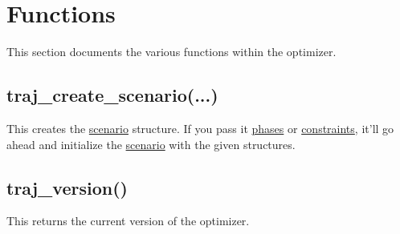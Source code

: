 \documentclass{article}
\begin{document}
	\section{Functions}
		This section documents the various functions within the optimizer.

		\subsection{traj\_create\_scenario(...)}
			This creates the \hyperref[sec:scenario]{scenario} structure. If you pass it \hyperref[sec:phase]{phases} or
			\hyperref[sec:constraint]{constraints}, it'll go ahead and initialize the \hyperref[sec:scenario]{scenario}
			with the given structures.

		\subsection{traj\_version()}
			This returns the current version of the optimizer.
\end{document}
